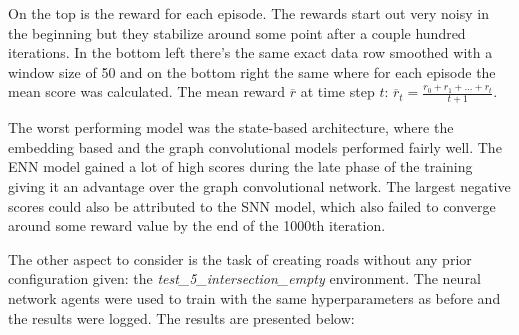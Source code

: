 \documentclass[
]{elteikthesis}[2023/04/10]
\begin{document}
On the top is the reward for each episode. The rewards start out very
noisy in the beginning but they stabilize around some point after
a couple hundred iterations. In the bottom left there's the same exact
data row smoothed with a window size of 50 and on the bottom right
the same where for each episode the mean score was calculated. The
mean reward $\overline{r}$ at time step $t$: $\overline{r}_{t}=\frac{r_{0}+r_{1}+...+r_{t}}{t+1}$. 

The worst performing model was the state-based architecture, where
the embedding based and the graph convolutional models performed fairly
well. The ENN model gained a lot of high scores during the late phase
of the training giving it an advantage over the graph convolutional
network. The largest negative scores could also be attributed to the
SNN model, which also failed to converge around some reward value
by the end of the 1000th iteration. 

The other aspect to consider is the task of creating roads without
any prior configuration given: the \emph{test\_5\_intersection\_empty}
environment. The neural network agents were used to train with the
same hyperparameters as before and the results were logged. The results
are presented below:
\end{document}
